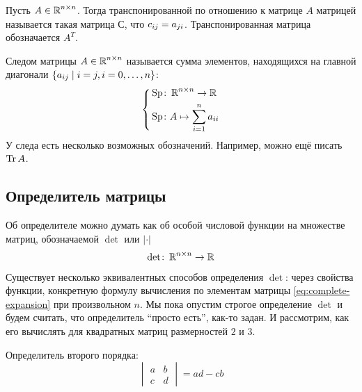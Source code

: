 \documentclass[a4paper,12pt]{article}
\begin{document}
  \begin{definition}
    Пусть $A \in \operatorname{\mathbb R}^{n \times n}$.
    Тогда транспонированной по отношению к матрице $A$ матрицей называется такая матрица $С$, что
    $c_{ij} \hm= a_{ji}$.
    Транспонированная матрица обозначается $A^T$.
  \end{definition}
  
  \begin{definition}
    Следом матрицы $A \in \operatorname{\mathbb R}^{n \times n}$ называется сумма элементов, находящихся на главной диагонали $\{a_{ij} \hm\mid i = j, i = 0, \ldots, n\}$:
    \[
      \left\{
        \begin{aligned}
          &\operatorname{Sp} \colon \operatorname{\mathbb R}^{n \times n} \to \operatorname{\mathbb R}\\
          &\operatorname{Sp} \colon A \mapsto \sum_{i = 1}^n a_{ii}
        \end{aligned}
      \right.
    \]
    У следа есть несколько возможных обозначений.
    Например, можно ещё писать $\operatorname{Tr} A$.
  \end{definition}


  \subsection{Определитель матрицы}
  
  Об определителе можно думать как об особой числовой функции на множестве матриц, обозначаемой $\det$ или $|\cdot|$
  \[
    \det \colon \operatorname{\mathbb R}^{n\times n} \to \operatorname{\mathbb R}
  \]
  Существует несколько эквивалентных способов определения $\det$: через свойства функции, конкретную формулу вычисления по элементам матрицы \ref{eq:complete-expansion} при произвольном $n$.
  Мы пока опустим строгое определение $\det$ и будем считать, что определитель ``просто есть'', как-то задан.
  И рассмотрим, как его вычислять для квадратных матриц размерностей $2$ и $3$.
  
  \begin{example}
    Определитель второго порядка:
    \[
      \begin{vmatrix}
        a & b\\
        c & d
      \end{vmatrix} = ad - cb
    \]
  \end{example}
\end{document}
